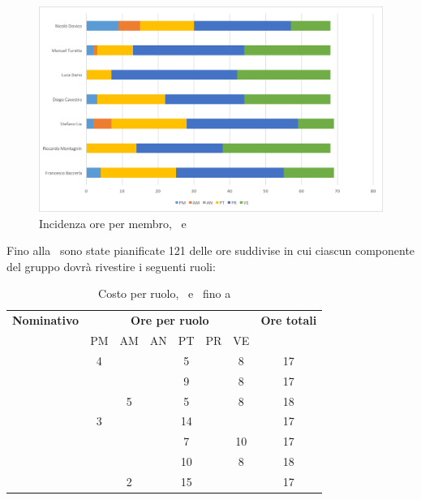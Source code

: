 \begin{figure}[H]
	\centering 
	\includegraphics[scale=0.7]{Immagini/GraficiPianoLavoro/PDCOD.png}
	\caption{Incidenza ore per membro, \PD\ e \COD}
\end{figure}

\newpage
Fino alla \RP\ sono state pianificate 121 delle ore suddivise in cui ciascun componente del gruppo dovrà rivestire i seguenti ruoli:
\begin{table}[h]
	\begin{center}
		\begin{tabular}{|c|c|c|c|c|c|c|c|}
			\hline
			\textbf{Nominativo} & \multicolumn{6}{c|}{\textbf{Ore per ruolo}} & \textbf{Ore totali} \\
					& PM & AM & AN & PT & PR & VE & \\
			\hline
			\FB		& 4  &	  &	   & 5	&	 & 8  &	17	\\
			\hline
			\RM		&	 &	  &	   & 9	&	 & 8 & 17	\\
			\hline
			\SL		&	 & 5  &	   & 5	&	 & 8  &	18	\\
			\hline
			\DC		& 3	 &	  &	   & 14	&	 & 	  &	17	\\
			\hline
			\LD 	&	 &	  &	   & 7	&	 & 10  &	17	\\
			\hline
			\MT		& 	 & 	  &	   & 10	&	 & 8  &	18	\\
			\hline
			\ND 	&	 & 2  &	   & 15	&	 &	  & 17	\\
			\hline
		\end{tabular}
	\end{center}
	\caption{Costo per ruolo, \PD\ e \COD\ fino a \RP}
\end{table}

